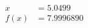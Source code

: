 \documentclass[preview]{standalone}
\begin{document}
\begin{align*}
x &= 5.0499\\f(x) &= 7.9996890
\end{align*}
\end{document}
